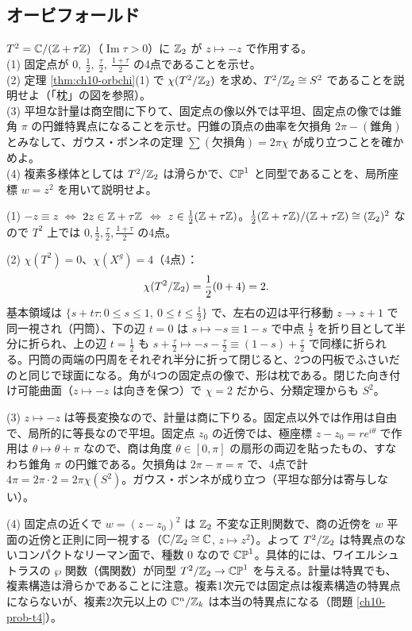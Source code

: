 \subsection{オービフォールド}

\begin{problem}[難易度 B]\label{ch10-prob-pillow}
$T^2=\mathbb{C}/(\mathbb{Z}+\tau\mathbb{Z})$（$\operatorname{Im}\tau>0$）に $\mathbb{Z}_2$ が $z\mapsto-z$ で作用する。\\
(1) 固定点が $0,\ \frac12,\ \frac\tau2,\ \frac{1+\tau}{2}$ の4点であることを示せ。\\
(2) 定理 \ref{thm:ch10-orbchi}(1) で $\chi(T^2/\mathbb{Z}_2)$ を求め、$T^2/\mathbb{Z}_2\cong S^2$ であることを説明せよ（「枕」の図を参照）。\\
(3) 平坦な計量は商空間に下りて、固定点の像以外では平坦、固定点の像では錐角 $\pi$ の円錐特異点になることを示せ。円錐の頂点の曲率を欠損角 $2\pi-(\text{錐角})$ とみなして、ガウス・ボンネの定理 $\sum(\text{欠損角})=2\pi\chi$ が成り立つことを確かめよ。\\
(4) 複素多様体としては $T^2/\mathbb{Z}_2$ は滑らかで、$\mathbb{CP}^1$ と同型であることを、局所座標 $w=z^2$ を用いて説明せよ。
\end{problem}

\begin{solution}
(1) $-z\equiv z$ $\Leftrightarrow$ $2z\in\mathbb{Z}+\tau\mathbb{Z}$ $\Leftrightarrow$ $z\in\frac12(\mathbb{Z}+\tau\mathbb{Z})$。$\frac12(\mathbb{Z}+\tau\mathbb{Z})/(\mathbb{Z}+\tau\mathbb{Z})\cong(\mathbb{Z}_2)^2$ なので $T^2$ 上では $0,\frac12,\frac\tau2,\frac{1+\tau}{2}$ の4点。

(2) $\chi(T^2)=0$、$\chi(X^g)=4$（4点）：
\[
\chi(T^2/\mathbb{Z}_2)=\frac12(0+4)=2 .
\]
基本領域は $\{s+t\tau:0\le s\le1,\ 0\le t\le\frac12\}$ で、左右の辺は平行移動 $z\to z+1$ で同一視され（円筒）、下の辺 $t=0$ は $s\mapsto-s\equiv1-s$ で中点 $\frac12$ を折り目として半分に折られ、上の辺 $t=\frac12$ も $s+\frac\tau2\mapsto-s-\frac\tau2\equiv(1-s)+\frac\tau2$ で同様に折られる。円筒の両端の円周をそれぞれ半分に折って閉じると、2つの円板でふさいだのと同じで球面になる。角が4つの固定点の像で、形は枕である。閉じた向き付け可能曲面（$z\mapsto-z$ は向きを保つ）で $\chi=2$ だから、分類定理からも $S^2$。

(3) $z\mapsto-z$ は等長変換なので、計量は商に下りる。固定点以外では作用は自由で、局所的に等長なので平坦。固定点 $z_0$ の近傍では、極座標 $z-z_0=re^{i\theta}$ で作用は $\theta\mapsto\theta+\pi$ なので、商は角度 $\theta\in[0,\pi]$ の扇形の両辺を貼ったもの、すなわち錐角 $\pi$ の円錐である。欠損角は $2\pi-\pi=\pi$ で、4点で計 $4\pi=2\pi\cdot2=2\pi\chi(S^2)$。ガウス・ボンネが成り立つ（平坦な部分は寄与しない）。

(4) 固定点の近くで $w=(z-z_0)^2$ は $\mathbb{Z}_2$ 不変な正則関数で、商の近傍を $w$ 平面の近傍と正則に同一視する（$\mathbb{C}/\mathbb{Z}_2\cong\mathbb{C}$, $z\mapsto z^2$）。よって $T^2/\mathbb{Z}_2$ は特異点のないコンパクトなリーマン面で、種数 $0$ なので $\mathbb{CP}^1$。具体的には、ワイエルシュトラスの $\wp$ 関数（偶関数）が同型 $T^2/\mathbb{Z}_2\to\mathbb{CP}^1$ を与える。計量は特異でも、複素構造は滑らかであることに注意。複素1次元では固定点は複素構造の特異点にならないが、複素2次元以上の $\mathbb{C}^n/\mathbb{Z}_k$ は本当の特異点になる（問題 \ref{ch10-prob-t4}）。
\end{solution}

